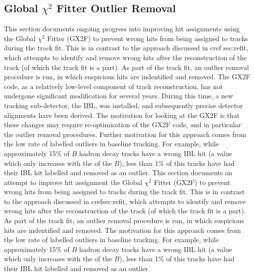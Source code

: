 \subsection{Global \texorpdfstring{$\chi^2$}{chi2} Fitter Outlier Removal}\label{sec:gx2f_opt}
This section documents ongoing progress into improving hit assignments using the Global $\chi^2$ Fitter (GX2F) to prevent wrong hits from being assigned to tracks during the track fit. This is in contrast to the approach discussed in  cref sec:refit, which attempts to identify and remove wrong hits after the reconstruction of the track (of which the track fit is a part). As part of the track fit, an outlier removal procedure is run, in which suspicious hits are indentified and removed. The GX2F code, as a relatively low-level component of track reconstruction, has not undergone significant modification for several years. During this time, a new tracking sub-detector, the IBL, was installed, and subsequently precise detector alignments have been derived. The motivation for looking at the GX2F is that these changes may require re-optimisation of the GX2F code, and in particular the outlier removal procedures. Further motivation for this approach comes from the low rate of labelled outliers in baseline tracking. For example, while approximately 15\% of $B$ hadron decay tracks have a wrong IBL hit (a value which only increases with the \pT of the $B$), less than 1\% of this tracks have had their IBL hit labelled and removed as an outlier.
This section documents an attempt to improve hit assignment the Global $\chi^2$ Fitter (GX2F) to prevent wrong hits from being assigned to tracks during the track fit. This is in contrast to the approach discussed in cref{sec:refit}, which attempts to identify and remove wrong hits after the reconstruction of the track (of which the track fit is a part). As part of the track fit, an outlier removal procedure is run, in which suspicious hits are indentified and removed. The motivation for this approach comes from the low rate of labelled outliers in baseline tracking. For example, while approximately 15\% of $B$ hadron decay tracks have a wrong IBL hit (a value which only increases with the \pt of the $B$), less than 1\% of this tracks have had their IBL hit labelled and removed as an outlier.

